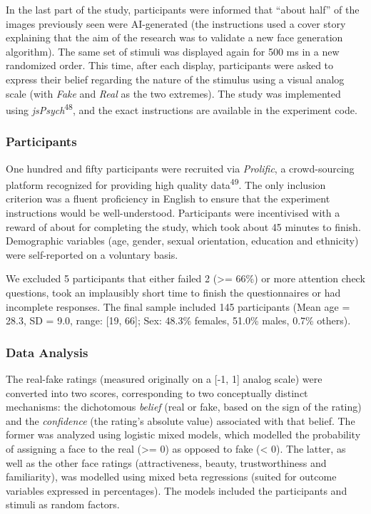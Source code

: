 \documentclass[
  man,floatsintext]{apa6}
\begin{document}
In the last part of the study, participants were informed that ``about half'' of the images previously seen were AI-generated (the instructions used a cover story explaining that the aim of the research was to validate a new face generation algorithm). The same set of stimuli was displayed again for 500 ms in a new randomized order. This time, after each display, participants were asked to express their belief regarding the nature of the stimulus using a visual analog scale (with \emph{Fake} and \emph{Real} as the two extremes). The study was implemented using \emph{jsPsych}\textsuperscript{48}, and the exact instructions are available in the experiment code.

\hypertarget{participants}{%
\subsubsection{Participants}\label{participants}}

One hundred and fifty participants were recruited via \emph{Prolific}, a crowd-sourcing platform recognized for providing high quality data\textsuperscript{49}. The only inclusion criterion was a fluent proficiency in English to ensure that the experiment instructions would be well-understood. Participants were incentivised with a reward of about  for completing the study, which took about 45 minutes to finish. Demographic variables (age, gender, sexual orientation, education and ethnicity) were self-reported on a voluntary basis.

We excluded 5 participants that either failed 2 (\textgreater= 66\%) or more attention check questions, took an implausibly short time to finish the questionnaires or had incomplete responses. The final sample included 145 participants (Mean age = 28.3, SD = 9.0, range: {[}19, 66{]}; Sex: 48.3\% females, 51.0\% males, 0.7\% others).

\hypertarget{data-analysis}{%
\subsubsection{Data Analysis}\label{data-analysis}}

The real-fake ratings (measured originally on a {[}-1, 1{]} analog scale) were converted into two scores, corresponding to two conceptually distinct mechanisms: the dichotomous \emph{belief} (real or fake, based on the sign of the rating) and the \emph{confidence} (the rating's absolute value) associated with that belief. The former was analyzed using logistic mixed models, which modelled the probability of assigning a face to the real (\textgreater= 0) as opposed to fake (\textless{} 0). The latter, as well as the other face ratings (attractiveness, beauty, trustworthiness and familiarity), was modelled using mixed beta regressions (suited for outcome variables expressed in percentages). The models included the participants and stimuli as random factors.
\end{document}
